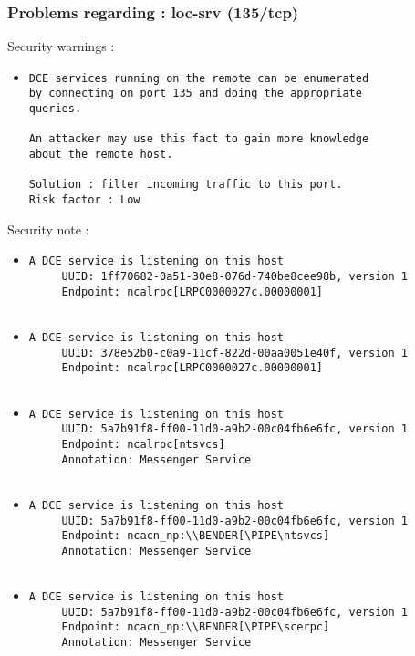 \documentclass{article}
\begin{document}
\subsubsection{Problems regarding : loc-srv (135/tcp)}
Security warnings :\\
\begin{itemize}
\item \begin{verbatim}
DCE services running on the remote can be enumerated
by connecting on port 135 and doing the appropriate
queries.

An attacker may use this fact to gain more knowledge
about the remote host.

Solution : filter incoming traffic to this port.
Risk factor : Low
\end{verbatim}\end{itemize}
Security note :\\
\begin{itemize}
\item \begin{verbatim}
A DCE service is listening on this host
     UUID: 1ff70682-0a51-30e8-076d-740be8cee98b, version 1
     Endpoint: ncalrpc[LRPC0000027c.00000001]


\end{verbatim}\item \begin{verbatim}
A DCE service is listening on this host
     UUID: 378e52b0-c0a9-11cf-822d-00aa0051e40f, version 1
     Endpoint: ncalrpc[LRPC0000027c.00000001]


\end{verbatim}\item \begin{verbatim}
A DCE service is listening on this host
     UUID: 5a7b91f8-ff00-11d0-a9b2-00c04fb6e6fc, version 1
     Endpoint: ncalrpc[ntsvcs]
     Annotation: Messenger Service


\end{verbatim}\item \begin{verbatim}
A DCE service is listening on this host
     UUID: 5a7b91f8-ff00-11d0-a9b2-00c04fb6e6fc, version 1
     Endpoint: ncacn_np:\\BENDER[\PIPE\ntsvcs]
     Annotation: Messenger Service


\end{verbatim}\item \begin{verbatim}
A DCE service is listening on this host
     UUID: 5a7b91f8-ff00-11d0-a9b2-00c04fb6e6fc, version 1
     Endpoint: ncacn_np:\\BENDER[\PIPE\scerpc]
     Annotation: Messenger Service


\end{verbatim}\end{itemize}
\end{document}
